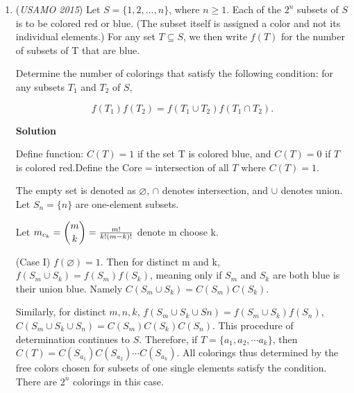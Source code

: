 \begin{enumerate}
 Lemma $2$: The locus of $N_9$ as $X$ moves along $\overline{PQ}$ is a circle centered about $A$.We add the midpoint of $\overline{AS}$, $N$, and let the circumradius of $\triangle AST$ be $R$. Taking the power of $A$ with respect to $(N_9)$, we get 
 \[AN_9^2 - \left(\frac{1}{2} R\right)^2 = \text{Pow}_{(N_9)} A = AX \cdot AN = \frac{1}{2} AX \cdot AS = \frac{1}{2} AP^2.\]Hence, $AN_9 = \sqrt{\frac{1}{4}R^2 + \frac{1}{2}AP^2}$, which remains constant as $X$ moves.

 Next, consider the homothety of scale factor $\frac{2}{3}$ about $O$ mapping $N_9$ to $G$. This means that the locus of $G$ is a circle as well.

 Finally, we take a homothety of scale factor $\frac{3}{2}$ about $A$ mapping $G$ to $M$. Hence, the locus of $M$  is a circle, as desired. - Spacesam

 


	\item (\textit{USAMO 2015}) Let $S = \{1, 2, ..., n\}$, where $n \ge 1$. Each of the $2^n$ subsets of $S$ is to be colored red or blue. (The subset itself is assigned a color and not its individual elements.) For any set $T \subseteq S$, we then write $f(T)$ for the number of subsets of T that are blue.


 Determine the number of colorings that satisfy the following condition: for any subsets $T_1$ and $T_2$ of $S$,

 \[f(T_1)f(T_2) = f(T_1 \cup T_2)f(T_1 \cap T_2).\]




\textbf{Solution}

Define function: $C(T)=1$ if the set T is colored blue, and $C(T)=0$ if $T$ is colored red.Define the $\text{Core} =\text{intersection of all } T \text{ where } C(T)=1$. 

 The empty set is denoted as $\varnothing$, $\cap$ denotes intersection, and $\cup$ denotes union. Let $S_n=\{n\}$ are one-element subsets.

 Let $m_{c_k}=\dbinom{m}{k} = \frac{m!}{k!(m-k)!}$ denote m choose k.

 
(Case I) $f(\varnothing)=1$. Then for distinct m and k, $f(S_m \cup S_k)=f(S_m)f(S_k)$, meaning only if $S_m$ and $S_k$ are both blue is their union blue. Namely $C(S_m \cup S_k)=C(S_m)C(S_k).$

 Similarly, for distinct $m,n,k$, $f(S_m \cup S_k \cup Sn)=f(S_m \cup S_k)f(S_n)$, $C(S_m \cup S_k \cup S_n)=C(S_m)C(S_k)C(S_n)$. This procedure of determination continues to $S$. Therefore, if $T=\{a_1,a_2, \cdots a_k\}$, then $C(T)=C(S_{a_1})C(S_{a_2}) \cdots C(S_{a_k})$. All colorings thus determined by the free colors chosen for subsets of one single elements satisfy the condition.  There are $2^n$ colorings in this case. 


\end{enumerate}
